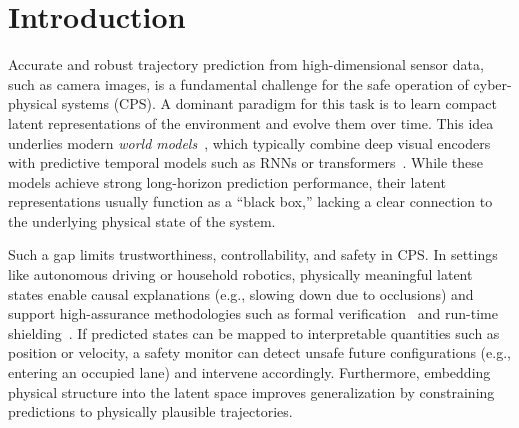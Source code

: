 \documentclass[nonacm,sigconf]{acmart}
\begin{document}





\maketitle
\section{Introduction}

Accurate and robust trajectory prediction from high-dimensional sensor data, such as camera images, is a fundamental challenge for the safe operation of cyber-physical systems (CPS). A dominant paradigm for this task is to learn compact latent representations of the environment and evolve them over time. This idea underlies modern \textit{world models}~\cite{ha2018world}, which typically combine deep visual encoders with predictive temporal models such as RNNs or transformers~\cite{micheli2022transformers, hafner2023mastering, seo2023masked}. While these models achieve strong long-horizon prediction performance, their latent representations usually function as a ``black box,'' lacking a clear connection to the underlying physical state of the system.

Such a gap limits trustworthiness, controllability, and safety in CPS. In settings like autonomous driving or household robotics, physically meaningful latent states enable causal explanations (e.g., slowing down due to occlusions) and support high-assurance methodologies such as formal verification~\cite{hasan2015formal, katz2022verification} and run-time shielding~\cite{alshiekh2018safe, waga2022dynamic}. If predicted states can be mapped to interpretable quantities such as position or velocity, a safety monitor can detect unsafe future configurations (e.g., entering an occupied lane) and intervene accordingly. Furthermore, embedding physical structure into the latent space improves generalization by constraining predictions to physically plausible trajectories.
\end{document}
